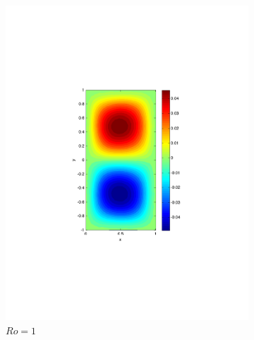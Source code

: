 \begin{figure}
\begin{center}
\begin{subfigure}{0.4\textwidth}
    \includegraphics[scale=0.5]{Figures/Re200Ro1h16k1000}
    \caption{$Ro=1$}
    \label{sfi:QGERo1}
  \end{subfigure}
  \begin{subfigure}{0.3\textwidth}
    \centering

\end{subfigure}
\end{center}
\end{figure}
